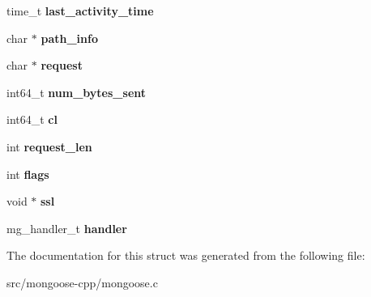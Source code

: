 \begin{DoxyCompactItemize}
\item 
time\+\_\+t {\bfseries last\+\_\+activity\+\_\+time}\hypertarget{structconnection_af4d7fcf22a73636ac43d5a62d6502e21}{}\label{structconnection_af4d7fcf22a73636ac43d5a62d6502e21}

\item 
char $\ast$ {\bfseries path\+\_\+info}\hypertarget{structconnection_ad0715458bffff8e5408ae7d16303be02}{}\label{structconnection_ad0715458bffff8e5408ae7d16303be02}

\item 
char $\ast$ {\bfseries request}\hypertarget{structconnection_aa3be303ab148026058fd456a80040446}{}\label{structconnection_aa3be303ab148026058fd456a80040446}

\item 
int64\+\_\+t {\bfseries num\+\_\+bytes\+\_\+sent}\hypertarget{structconnection_ae7bfe72a24ab795993c228c7bd58ace7}{}\label{structconnection_ae7bfe72a24ab795993c228c7bd58ace7}

\item 
int64\+\_\+t {\bfseries cl}\hypertarget{structconnection_a0831315235b6847023a1bccd1a90b511}{}\label{structconnection_a0831315235b6847023a1bccd1a90b511}

\item 
int {\bfseries request\+\_\+len}\hypertarget{structconnection_aaaceaa100948785092d6a1d0522c679b}{}\label{structconnection_aaaceaa100948785092d6a1d0522c679b}

\item 
int {\bfseries flags}\hypertarget{structconnection_aa0829a1713621e3f121f930e31f447f4}{}\label{structconnection_aa0829a1713621e3f121f930e31f447f4}

\item 
void $\ast$ {\bfseries ssl}\hypertarget{structconnection_a5802a5a903e3700c522a9ee859b64e71}{}\label{structconnection_a5802a5a903e3700c522a9ee859b64e71}

\item 
mg\+\_\+handler\+\_\+t {\bfseries handler}\hypertarget{structconnection_a6c779bb0123acc10f81ba8026a2a91ef}{}\label{structconnection_a6c779bb0123acc10f81ba8026a2a91ef}

\end{DoxyCompactItemize}


The documentation for this struct was generated from the following file\+:\begin{DoxyCompactItemize}
\item 
src/mongoose-\/cpp/mongoose.\+c\end{DoxyCompactItemize}
